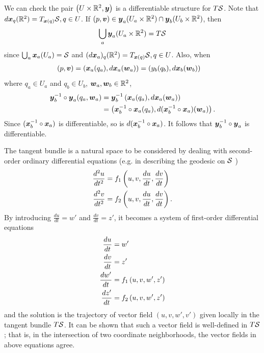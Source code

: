 \documentclass[11pt]{article}
\begin{document}
\begin{enumerate}
\begin{example}
We can check the pair $\left( U \times {\mathbb R}^{2},  \boldsymbol{y}\right)$ is a differentiable structure for $T{\mathcal S}$. Note that $d\boldsymbol{x}_{q}({\mathbb R}^{2}) = T_{\boldsymbol{x}(q)}{\mathcal S}, q\in U$. If $(p, \boldsymbol{v}) \in \boldsymbol{y}_{a}(U_{a}\times {\mathbb R}^{2}) \cap \boldsymbol{y}_{b}(U_{b}\times {\mathbb R}^{2}) $, then
\begin{align*}
\bigcup_{a}\boldsymbol{y}_{a}(U_{a}\times {\mathbb R}^{2}) = T{\mathcal S}
\end{align*}
since $\bigcup_{a}\boldsymbol{x}_{a}(U_{a}) = {\mathcal S}$ and $(d\boldsymbol{x}_{a})_{q}({\mathbb R}^{2}) = T_{\boldsymbol{x}(q)}{\mathcal S}, q\in U$.
Also, when
\begin{align*}
(p, \boldsymbol{v})  &= (\boldsymbol{x}_{a}(q_{a}),  d\boldsymbol{x}_{a}(\boldsymbol{w}_{a})) = (y_{b}(q_{b}), d\boldsymbol{x}_{b}(\boldsymbol{w}_{b}))
\end{align*}
where $q_{a}\in U_{a}$ and $q_{b}\in U_{b}$, $\boldsymbol{w}_{a}, \boldsymbol{w}_{b}\in {\mathbb R}^{2}$,  
\begin{align*}
\boldsymbol{y}_{b}^{-1}\circ \boldsymbol{y}_{a}(q_{a}, \boldsymbol{w}_{a}) &= \boldsymbol{y}_{b}^{-1}\left(\boldsymbol{x}_{a}(q_{a}),  d\boldsymbol{x}_{a}(\boldsymbol{w}_{a})\right)\\
&= \left( \boldsymbol{x}_{b}^{-1}\circ\boldsymbol{x}_{a}(q_{a}), d(\boldsymbol{x}_{b}^{-1}\circ \boldsymbol{x}_{a})(\boldsymbol{w}_{a})  \right).
\end{align*}
Since $(\boldsymbol{x}_{b}^{-1}\circ\boldsymbol{x}_{a})$ is differentiable, so is $d(\boldsymbol{x}_{b}^{-1}\circ\boldsymbol{x}_{a})$. It follows that $\boldsymbol{y}_{b}^{-1}\circ \boldsymbol{y}_{a}$ is differentiable. 

The tangent bundle is a natural space to be considered by dealing with second-order ordinary differential equations (e.g. in describing the geodesic on ${\mathcal S}$ ) 
\begin{align*}
\frac{d^{2}u}{dt^{2}} &= f_{1}\left(u, v, \frac{du}{dt}, \frac{dv}{dt}\right)\\
\frac{d^{2}v}{dt^{2}} &= f_{2}\left(u, v, \frac{du}{dt}, \frac{dv}{dt}\right).
\end{align*}
By introducing $\frac{du}{dt} = w'$ and $\frac{dv}{dt} = z'$,  it becomes a system of first-order differential equations
\begin{align*}
\frac{du}{dt} &= w'\\
\frac{dv}{dt} &= z'\\
\frac{dw'}{dt} &= f_{1}\left(u, v, w', z'\right)\\
\frac{dz'}{dt} &= f_{2}\left(u, v, w', z'\right)
\end{align*}
and the solution is the trajectory of vector field $(u, v, w', v')$ given locally in the tangent bundle $T{\mathcal S}$. It can be shown that such a vector field is well-defined in $T{\mathcal S}$; that is, in the intersection of two coordinate neighborhoods, the vector fields in above equations agree. 


\end{example}
\end{enumerate}
\end{document}
